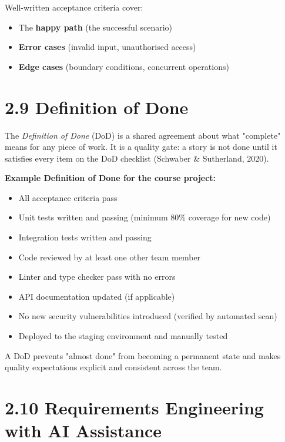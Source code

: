 \documentclass[11pt,a4paper]{book}
\begin{document}
Well-written acceptance criteria cover:
\begin{itemize}
  \item The \textbf{happy path} (the successful scenario)
  \item \textbf{Error cases} (invalid input, unauthorised access)
  \item \textbf{Edge cases} (boundary conditions, concurrent operations)
\end{itemize}

\medskip

\section{2.9 Definition of Done}

The \textit{Definition of Done} (DoD) is a shared agreement about what "complete" means for any piece of work. It is a quality gate: a story is not done until it satisfies every item on the DoD checklist (Schwaber \& Sutherland, 2020).

\textbf{Example Definition of Done for the course project:}

\begin{itemize}
  \item [ ] All acceptance criteria pass
  \item [ ] Unit tests written and passing (minimum 80\% coverage for new code)
  \item [ ] Integration tests written and passing
  \item [ ] Code reviewed by at least one other team member
  \item [ ] Linter and type checker pass with no errors
  \item [ ] API documentation updated (if applicable)
  \item [ ] No new security vulnerabilities introduced (verified by automated scan)
  \item [ ] Deployed to the staging environment and manually tested
\end{itemize}

A DoD prevents "almost done" from becoming a permanent state and makes quality expectations explicit and consistent across the team.

\medskip

\section{2.10 Requirements Engineering with AI Assistance}
\end{document}
